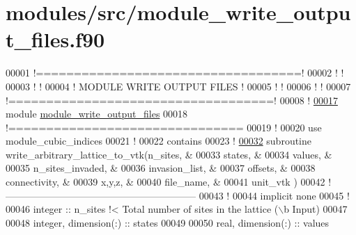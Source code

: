 \hypertarget{module__write__output__files_8f90_source}{
\section{modules/src/module\-\_\-write\-\_\-output\-\_\-files.f90}
}

\begin{DoxyCode}
00001 \textcolor{comment}{!===================================!}
00002 \textcolor{comment}{!                                   !}
00003 \textcolor{comment}{!                                   !}
00004 \textcolor{comment}{!     MODULE WRITE OUTPUT FILES     !}
00005 \textcolor{comment}{!                                   !}
00006 \textcolor{comment}{!                                   !}
00007 \textcolor{comment}{!===================================!}
00008 \textcolor{comment}{!}
\hypertarget{module__write__output__files_8f90_source_l00017}{}\hyperlink{classmodule__write__output__files}{00017} \textcolor{keyword}{module} \hyperlink{classmodule__write__output__files}{module_write_output_files}
00018 \textcolor{comment}{!===============================}
00019 \textcolor{comment}{!}
00020 use \textcolor{keywordflow}{module\_cubic\_indices}
00021 \textcolor{comment}{!}
00022 \textcolor{keyword}{contains}
00023 \textcolor{comment}{!}
\hypertarget{module__write__output__files_8f90_source_l00032}{}\hyperlink{classmodule__write__output__files_a390b751aaed5db2d8f1fe646fc9a0feb}{00032} \textcolor{keyword}{subroutine }write\_arbitrary\_lattice\_to\_vtk(n\_sites,         &
00033                                           states,          &
00034                                           values,          &
00035                                           n\_sites\_invaded, &
00036                                           invasion\_list,   &
00037                                           offsets,         &
00038                                           connectivity,    &
00039                                           x,y,z,           &
00040                                           file\_name,       &
00041                                           unit\_vtk         )  
00042 \textcolor{comment}{!-----------------------------------------------------------}
00043 \textcolor{comment}{!}
00044 \textcolor{keyword}{implicit none}
00045 \textcolor{comment}{!}
00046 \textcolor{keywordtype}{integer} :: n\_sites \textcolor{comment}{!< Total number of sites in the lattice (\(\backslash\)b Input)}
00047 
00048 \textcolor{keywordtype}{integer}, \textcolor{keywordtype}{dimension(:)} :: states
00049 
00050 \textcolor{keywordtype}{real},    \textcolor{keywordtype}{dimension(:)} :: values 

\end{DoxyCode}
